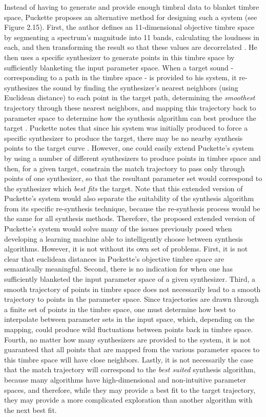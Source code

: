 \documentclass[a4paper,12pt]{report} 	%
\numberwithin{figure}{chapter}
\numberwithin{table}{chapter}
\numberwithin{equation}{chapter}
\begin{document}
\begin{flushleft}
Instead of having to generate and provide enough timbral data to blanket timbre space, Puckette \cite{Puckette:2004zp} proposes an alternative method for designing such a system (see Figure 2.15). First, the author defines an 11-dimensional objective timbre space by segmenting a spectrum's magnitude into 11 bands, calculating the loudness in each, and then transforming the result so that these values are decorrelated \cite[p. 1-2]{Puckette:2004zp}. He then uses a specific synthesizer to generate points in this timbre space by sufficiently blanketing the input parameter space. When a target sound - corresponding to a path in the timbre space - is provided to his system, it re-synthesizes the sound by finding the synthesizer's nearest neighbors (using Euclidean distance) to each point in the target path, determining the \emph{smoothest} trajectory through these nearest neighbors, and mapping this trajectory back to parameter space to determine how the synthesis algorithm can best produce the target \cite[p. 3]{Puckette:2004zp}. Puckette notes that since his system was initially produced to force a specific synthesizer to produce the target, there may be no nearby synthesis points to the target curve \cite[p. 3]{Puckette:2004zp}. However, one could easily extend Puckette's system by using a number of different synthesizers to produce points in timbre space and then, for a given target, constrain the match trajectory to pass only through points of one synthesizer, so that the resultant parameter set would correspond to the synthesizer which \emph{best fits} the target. Note that this extended version of Puckette's system would also separate the suitability of the synthesis algorithm from its specific re-synthesis technique, because the re-synthesis process would be the same for all synthesis methods. Therefore, the proposed extended version of Puckette's system would solve many of the issues previously posed when developing a learning machine able to intelligently choose between synthesis algorithms. However, it is not without its own set of problems. First, it is not clear that euclidean distances in Puckette's objective timbre space are semantically meaningful. Second, there is no indication for when one has sufficiently blanketed the input parameter space of a given synthesizer. Third, a smooth trajectory of points in timbre space does not necessarily lead to a smooth trajectory to points in the parameter space. Since trajectories are drawn through a finite set of points in the timbre space, one must determine how best to interpolate between parameter sets in the input space, which, depending on the mapping, could produce wild fluctuations between points back in timbre space. Fourth, no matter how many synthesizers are provided to the system, it is not guaranteed that all points that are mapped from the various parameter spaces to this timbre space will have close neighbors. Lastly, it is not necessarily the case that the match trajectory will correspond to the \emph{best suited} synthesis algorithm, because many algorithms have high-dimensional and non-intuitive parameter spaces, and therefore, while they may provide a best fit to the target trajectory, they may provide a more complicated exploration than another algorithm with the next best fit.

\end{flushleft}
\end{document}
